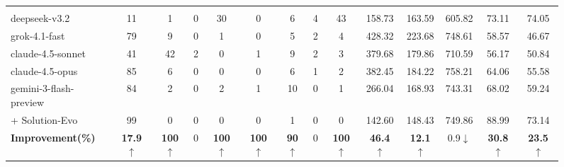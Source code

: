 \documentclass{article}
\theoremstyle{plain}
\theoremstyle{definition}
\theoremstyle{remark}
\begin{document}
\begin{figure}[t]
\begin{minipage}[t]{\textwidth}
\begin{tabular}{l cccccccc ccc c >{\columncolor{cyan!15}}c}
\midrule
\rowcolor{gray!15} \multicolumn{14}{c}{\textit{\textbf{C++}}} \\
deepseek-v3.2 & \cellcolor{cyan!15}11 & 1 & 0 & 30 & 0 & 6 & 4 & 43 & \cellcolor{cyan!15}158.73 & 163.59 & 605.82 & \cellcolor{cyan!15}73.11 & 74.05 \\
grok-4.1-fast & \cellcolor{cyan!15}79 & 9 & 0 & 1 & 0 & 5 & 2 & 4 & \cellcolor{cyan!15}428.32 & 223.68 & 748.61 & \cellcolor{cyan!15}58.57 & 46.67 \\
claude-4.5-sonnet & \cellcolor{cyan!15}41 & 42 & 2 & 0 & 1 & 9 & 2 & 3 & \cellcolor{cyan!15}379.68 & 179.86 & 710.59 & \cellcolor{cyan!15}56.17 & 50.84 \\
claude-4.5-opus & \cellcolor{cyan!15}85 & 6 & 0 & 0 & 0 & 6 & 1 & 2 & \cellcolor{cyan!15}382.45 & 184.22 & 758.21 & \cellcolor{cyan!15}64.06 & 55.58 \\
gemini-3-flash-preview & \cellcolor{cyan!15}84 & 2 & 0 & 2 & 1 & 10 & 0 & 1 & \cellcolor{cyan!15}266.04 & 168.93 & 743.31 & \cellcolor{cyan!15}68.02 & 59.24 \\
\quad + Solution-Evo & \cellcolor{cyan!15}99 & 0 & 0 & 0 & 0 & 1 & 0 & 0 & \cellcolor{cyan!15}142.60 & 148.43 & 749.86 & \cellcolor{cyan!15}88.99 & 73.14 \\
\cmidrule{2-14}
\textbf{Improvement(\%)} & \cellcolor{cyan!15}\textbf{17.9$\uparrow$} & \textbf{100$\uparrow$} & 0 & \textbf{100$\uparrow$} & \textbf{100$\uparrow$} & \textbf{90$\uparrow$} & 0 & \textbf{100$\uparrow$} & \cellcolor{cyan!15}\textbf{46.4$\uparrow$} & \textbf{12.1$\uparrow$} & 0.9$\downarrow$ & \cellcolor{cyan!15}\textbf{30.8$\uparrow$} & \textbf{23.5$\uparrow$} \\


\end{tabular}
\end{minipage}
\end{figure}
\end{document}
